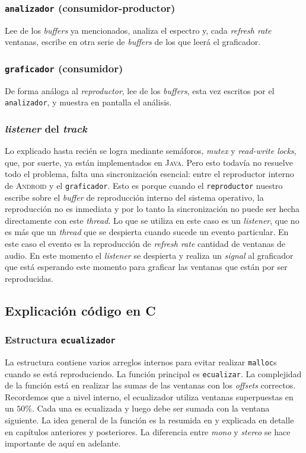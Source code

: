 \documentclass[%
    compressed,
    titlepage,
    narroweqnarray,
    inline,
    twoside,
    ]{ieee}
\begin{document}
\subsubsection{\texttt{analizador} (consumidor-productor)}
Lee de los \textit{buffers} ya mencionados, analiza el espectro y, cada \textit{refresh rate} ventanas, escribe en otra serie de \textit{buffers} de los
que leer\'a el graficador.
\subsubsection{\texttt{graficador} (consumidor)}
De forma an\'aloga al \textit{reproductor}, lee de los \textit{buffers}, esta vez escritos por el \texttt{analizador}, y muestra en pantalla el an\'alisis.

\subsubsection{\textit{listener} del \textit{track}}
Lo explicado hasta reci\'en se logra mediante sem\'aforos, \textit{mutex} y \textit{read-write locks}, que, por suerte, ya est\'an implementados en
\textsc{Java}. Pero esto todav\'ia no resuelve todo el problema, falta una sincronizaci\'on esencial: entre el reproductor interno de \textsc{Android} y el
\texttt{graficador}. Esto es porque cuando el \texttt{reproductor} nuestro escribe sobre el \textit{buffer} de reproducci\'on interno del sistema operativo,
la reproducci\'on no es inmediata y por lo tanto la sincronizaci\'on no puede ser hecha directamente con este \textit{thread}.
Lo que se utiliza en este caso es un \textit{listener}, que no es m\'as que un \textit{thread} que se despierta cuando sucede un evento particular. En este
caso el evento es la reproducci\'on de \textit{refresh rate} cantidad de ventanas de audio. En este momento el \textit{listener} se despierta y
realiza un \textit{signal} al graficador que est\'a esperando este momento para graficar las ventanas que est\'an por ser reproducidas.

\subsection{Explicaci\'on c\'odigo en \textsc{C}}

\subsubsection{Estructura \texttt{ecualizador}}
La estructura contiene varios arreglos internos para evitar realizar \texttt{malloc}s cuando se est\'a reproduciendo.
La funci\'on principal es \texttt{ecualizar}. La complejidad de la funci\'on est\'a en realizar las sumas de las ventanas con los \textit{offsets} correctos.
Recordemos que a nivel interno, el ecualizador utiliza ventanas superpuestas en un $50\%$. Cada una es ecualizada y luego debe ser sumada con la ventana
siguiente. La idea general de la funci\'on es la resumida en \cite[Generalized Window Method]{SASP} y explicada en detalle en cap\'itulos anteriores y
posteriores.
La diferencia entre \textit{mono} y \textit{stereo} se hace importante de aqu\'i en adelante.
\end{document}
